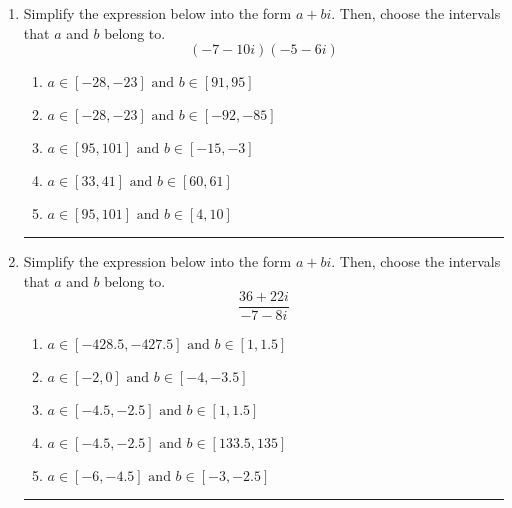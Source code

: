 \documentclass[14pt]{extbook}
\newcommand{\litem}[1]{\item#1\hspace*{-1cm}\rule{\textwidth}{0.4pt}}
\begin{document}
\begin{enumerate}
{\begin{enumerate}[label=\Alph*.]
\end{enumerate} }
\litem{
Simplify the expression below into the form $a+bi$. Then, choose the intervals that $a$ and $b$ belong to.\[ (-7 - 10 i)(-5 - 6 i) \]\begin{enumerate}[label=\Alph*.]
\item \( a \in [-28, -23] \text{ and } b \in [91, 95] \)
\item \( a \in [-28, -23] \text{ and } b \in [-92, -85] \)
\item \( a \in [95, 101] \text{ and } b \in [-15, -3] \)
\item \( a \in [33, 41] \text{ and } b \in [60, 61] \)
\item \( a \in [95, 101] \text{ and } b \in [4, 10] \)

\end{enumerate} }
\litem{
Simplify the expression below into the form $a+bi$. Then, choose the intervals that $a$ and $b$ belong to.\[ \frac{36 + 22 i}{-7 - 8 i} \]\begin{enumerate}[label=\Alph*.]
\item \( a \in [-428.5, -427.5] \text{ and } b \in [1, 1.5] \)
\item \( a \in [-2, 0] \text{ and } b \in [-4, -3.5] \)
\item \( a \in [-4.5, -2.5] \text{ and } b \in [1, 1.5] \)
\item \( a \in [-4.5, -2.5] \text{ and } b \in [133.5, 135] \)
\item \( a \in [-6, -4.5] \text{ and } b \in [-3, -2.5] \)

\end{enumerate} }
\end{enumerate}
\end{document}
